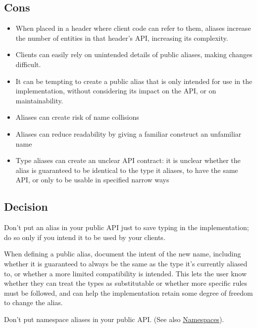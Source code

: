 \subsection{Cons}
\begin{itemize}
\item When placed in a header where client code can refer to them, aliases increase the number of entities in that header's API, increasing its complexity.
\item Clients can easily rely on unintended details of public aliases, making changes difficult.
\item It can be tempting to create a public alias that is only intended for use in the implementation, without considering its impact on the API, or on maintainability.
\item Aliases can create risk of name collisions
\item Aliases can reduce readability by giving a familiar construct an unfamiliar name
\item Type aliases can create an unclear API contract: it is unclear whether the alias is guaranteed to be identical to the type it aliases, to have the same API, or only to be usable in specified narrow ways
\end{itemize}

\subsection{Decision}
Don't put an alias in your public API just to save typing in the implementation; do so only if you intend it to be used by your clients.

When defining a public alias, document the intent of the new name, including whether it is guaranteed to always be the same as the type it's currently aliased to, or whether a more limited compatibility is intended. This lets the user know whether they can treat the types as substitutable or whether more specific rules must be followed, and can help the implementation retain some degree of freedom to change the alias.

Don't put namespace aliases in your public API. (See also \hyperref[sec:namespaces]{Namespaces}).

